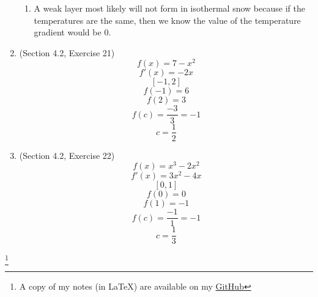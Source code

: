 \documentclass{article}
\newcommand\blfootnote[1]{
    \begingroup
    \renewcommand\thefootnote{}\footnote{#1}
    \addtocounter{footnote}{-1}
    \endgroup
}
\begin{document}
\begin{enumerate}
\begin{enumerate}
            \item A weak layer most likely will not form in isothermal snow because if the temperatures are the same, then we know the value of the temperature gradient would be $0$.
        \end{enumerate}
    \item (Section 4.2, Exercise 21)
        $$f(x) = 7 - x^2$$
        $$f'(x) = -2x$$
        $$[-1, 2]$$
        $$f(-1) = 6$$
        $$f(2) = 3$$
        $$f(c) = \frac{-3}{3} = -1$$
        $$c = \frac{1}{2}$$
    \item (Section 4.2, Exercise 22)
        $$f(x) = x^3 - 2x^2$$
        $$f'(x) = 3x^2 - 4x$$
        $$[0, 1]$$
        $$f(0) = 0$$
        $$f(1) = -1$$
        $$f(c) = \frac{-1}{1} = -1$$
        $$c = \frac{1}{3}$$
\end{enumerate}

\blfootnote{A copy of my notes (in \LaTeX) are available on my \href{https://github.com/onlinechronically/MATH-211}{GitHub}}
\end{document}
